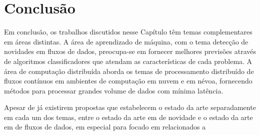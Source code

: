 \section{Conclusão}\label{sec:conclusao-relacionados}


Em conclusão, os trabalhos discutidos nesse Capítulo têm temas complementares em
áreas distintas.
A área de aprendizado de máquina, com o tema detecção de novidades em fluxos de
dados, preocupa-se em fornecer melhores previsões através de algoritmos
classificadores que atendam as características de cada problema.
A área de computação distribuída aborda os temas de processamento distribuído
de fluxos contínuos em ambientes de computação em nuvem e em névoa, fornecendo
métodos para processar grandes volume de dados com mínima latência.

Apesar de já existirem propostas que estabelecem o estado da arte separadamente
em cada um dos temas,  entre o
estado da arte em  de novidade e o estado da arte em
 de fluxos de dados, em especial para  focado em  relacionados a 
